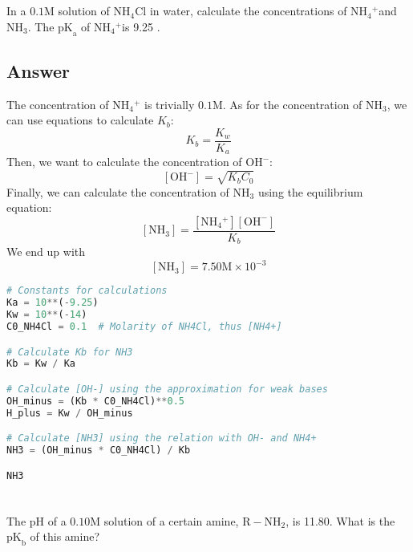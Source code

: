 \documentclass[12pt]{article}
\begin{document}
\section{}
In a $0.1 \mathrm{M}$ solution of $\mathrm{NH}_{4} \mathrm{Cl}$ in water, calculate the concentrations of $\mathrm{NH}_{4}{ }^{+}$and $\mathrm{NH}_{3}$. The $\mathrm{pK}_{\mathrm{a}}$ of $\mathrm{NH}_{4}{ }^{+}$is 9.25 .
\subsection{Answer}
The concentration of $\mathrm{NH}_{4}{ }^{+}$ is trivially $0.1 \mathrm{M}$. As for the concentration of $\mathrm{NH}_{3}$, we can use equations to calculate $K_b$:
\begin{equation}
  K_{b}=\frac{K_{w}}{K_{a}}
\end{equation}
Then, we want to calculate the concentration of $\mathrm{OH}^{-}$:
\begin{equation}
  \left[\mathrm{OH}^{-}\right]=\sqrt{K_{b} C_{0}}
\end{equation}
Finally, we can calculate the concentration of $\mathrm{NH}_{3}$ using the equilibrium equation:
\begin{equation}
  \left[\mathrm{NH}_{3}\right]=\frac{\left[\mathrm{NH}_{4}{ }^{+}\right]\left[\mathrm{OH}^{-}\right]}{K_{b}}
\end{equation}
We end up with
\begin{equation}
  \left[\mathrm{NH}_{3}\right]=7.50 \mathrm{M} \times 10^{-3}
\end{equation}
\begin{lstlisting}[language=Python]
# Constants for calculations
Ka = 10**(-9.25)
Kw = 10**(-14)
C0_NH4Cl = 0.1  # Molarity of NH4Cl, thus [NH4+]

# Calculate Kb for NH3
Kb = Kw / Ka

# Calculate [OH-] using the approximation for weak bases
OH_minus = (Kb * C0_NH4Cl)**0.5
H_plus = Kw / OH_minus

# Calculate [NH3] using the relation with OH- and NH4+
NH3 = (OH_minus * C0_NH4Cl) / Kb

NH3
\end{lstlisting}
\section{}
The $\mathrm{pH}$ of a $0.10 \mathrm{M}$ solution of a certain amine, $\mathrm{R}-\mathrm{NH}_{2}$, is 11.80. What is the $\mathrm{pK}_\mathrm{b}$ of this amine?
\end{document}
